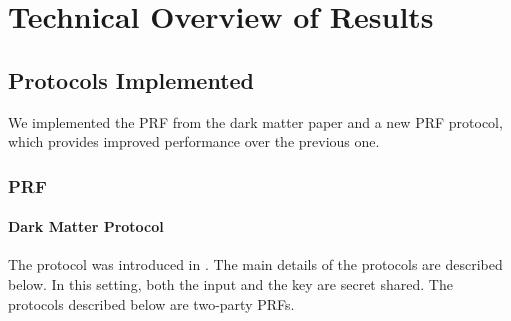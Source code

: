 
\section{Technical Overview of Results}
\label{sec:technical_overview}

\subsection{Protocols Implemented}

We implemented the PRF from the dark matter paper \cite{darkmatter} and a new PRF protocol, which provides improved performance over the previous one.

\subsubsection{PRF}

\paragraph{Dark Matter Protocol}

The protocol was introduced in \cite{darkmatter}. The main details of the protocols are described below. In this setting, both the input and the key are secret shared.
The protocols described below are two-party PRFs.


